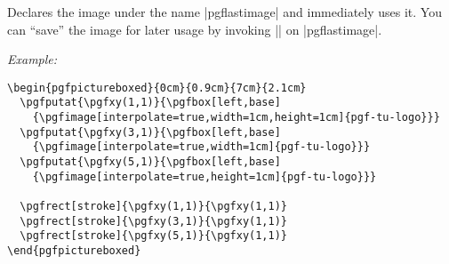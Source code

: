 \documentclass{ltxdoc}
\def\example{\par\smallskip\noindent\textit{Example: }}
\newcommand\opt[1]{{\color{black!50!green}#1}}
\renewcommand\oarg[1]{\opt{{\ttfamily[}\meta{#1}{\ttfamily]}}}
\begin{document}
\begin{command}{\pgfimage\oarg{options}}
  Declares the image under the name |pgflastimage| and
  immediately uses it. You can ``save'' the image for later usage by
  invoking |\pgfaliasimage| on |pgflastimage|.
  \example

\begin{verbatim}
\begin{pgfpictureboxed}{0cm}{0.9cm}{7cm}{2.1cm}
  \pgfputat{\pgfxy(1,1)}{\pgfbox[left,base]
    {\pgfimage[interpolate=true,width=1cm,height=1cm]{pgf-tu-logo}}}
  \pgfputat{\pgfxy(3,1)}{\pgfbox[left,base]
    {\pgfimage[interpolate=true,width=1cm]{pgf-tu-logo}}}
  \pgfputat{\pgfxy(5,1)}{\pgfbox[left,base]
    {\pgfimage[interpolate=true,height=1cm]{pgf-tu-logo}}}

  \pgfrect[stroke]{\pgfxy(1,1)}{\pgfxy(1,1)}
  \pgfrect[stroke]{\pgfxy(3,1)}{\pgfxy(1,1)}
  \pgfrect[stroke]{\pgfxy(5,1)}{\pgfxy(1,1)}
\end{pgfpictureboxed}
\end{verbatim}

\begin{pgfpictureboxed}{0cm}{0.9cm}{7cm}{2.1cm}

\end{pgfpictureboxed}
\end{command}
\end{document}
